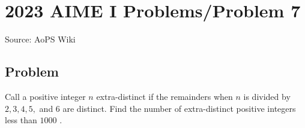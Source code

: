 \documentclass[12pt]{article}
\begin{document}
\section*{{2023 AIME I Problems/Problem 7}}
Source: AoPS Wiki

\subsection*{Problem}
Call a positive integer $n$ extra-distinct if the remainders when $n$ is divided by $2, 3, 4, 5,$ and $6$ are distinct. Find the number of extra-distinct positive integers less than $1000$ .
\end{document}
